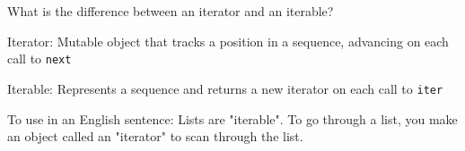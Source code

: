\begin{blocksection}
\question What is the difference between an iterator and an iterable?

\begin{solution}[0.5in]
Iterator: Mutable object that tracks a position in a sequence, advancing on each call to \lstinline$next$

Iterable: Represents a sequence and returns a new iterator on each call to \lstinline$iter$

To use in an English sentence:
Lists are "iterable". To go through a list, you make an object called an "iterator" to scan through the list.
\end{solution}
\end{blocksection}
